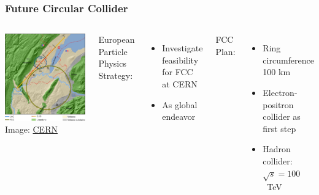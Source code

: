 \documentclass[aspectratio=169]{beamer}
\newcommand{\bluetext}[1]{%
  \textcolor{myBlue}{#1}
}
\begin{document}
\begin{frame}
  \frametitle{Future Circular Collider}

  \begin{columns}[c]
    \includegraphics[width=0.7\linewidth]{figures/FCC_CLIC.png}\\[-1mm]
    \tiny{Image: \href{https://alumni.cern/news/226282}{CERN}}

    \bluetext{European Particle Physics Strategy:}
    \begin{itemize}
      \item Investigate feasibility for FCC at CERN
      \item As global endeavor
    \end{itemize}

    \bluetext{FCC Plan:}
    \begin{itemize}
      \item Ring circumference 100 km
      \item Electron-positron collider as first step
      \item Hadron collider: $\sqrt{s} = 100$~TeV
    \end{itemize}
  \end{columns}
\end{frame}
\end{document}
